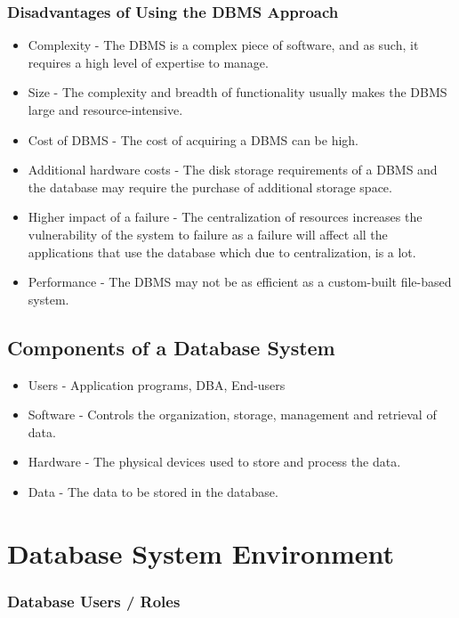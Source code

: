 \documentclass[12pt letter]{report}
\begin{document}
\subsection{Disadvantages of Using the DBMS Approach}

\begin{itemize}
  \item Complexity - The DBMS is a complex piece of software, and as such, it requires a high level of expertise to
        manage.
  \item Size - The complexity and breadth of functionality usually makes the DBMS large and resource-intensive.
  \item Cost of DBMS - The cost of acquiring a DBMS can be high.
  \item Additional hardware costs - The disk storage requirements of a DBMS and the database may require the purchase of
        additional storage space.
  \item Higher impact of a failure - The centralization of resources increases the vulnerability of the system to
        failure as a failure will affect all the applications that use the database which due to centralization, is a lot.
  \item Performance - The DBMS may not be as efficient as a custom-built file-based system.
\end{itemize}

\section{Components of a Database System}

\begin{itemize}
  \item Users - Application programs, DBA, End-users
  \item Software - Controls the organization, storage, management and retrieval of data.
  \item Hardware - The physical devices used to store and process the data.
  \item Data - The data to be stored in the database.
\end{itemize}


\chapter{Database System Environment}

\subsection{Database Users / Roles}
\end{document}
